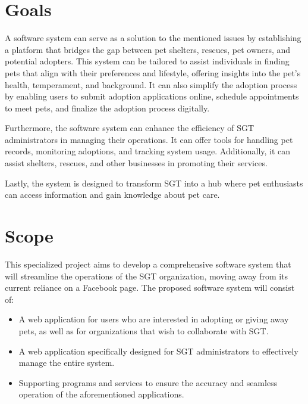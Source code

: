 \section{Goals}

A software system can serve as a solution to the mentioned issues by establishing a platform that bridges the gap between pet shelters, rescues, pet owners, and potential adopters. This system can be tailored to assist individuals in finding pets that align with their preferences and lifestyle, offering insights into the pet’s health, temperament, and background. It can also simplify the adoption process by enabling users to submit adoption applications online, schedule appointments to meet pets, and finalize the adoption process digitally.

Furthermore, the software system can enhance the efficiency of SGT administrators in managing their operations. It can offer tools for handling pet records, monitoring adoptions, and tracking system usage. Additionally, it can assist shelters, rescues, and other businesses in promoting their services.

Lastly, the system is designed to transform SGT into a hub where pet enthusiasts can access information and gain knowledge about pet care.

\section{Scope}

This specialized project aims to develop a comprehensive software system that will streamline the operations of the SGT organization, moving away from its current reliance on a Facebook page. The proposed software system will consist of:
\begin{itemize}
    \item 	A web application for users who are interested in adopting or giving away pets, as well as for organizations that wish to collaborate with SGT.
    \item	A web application specifically designed for SGT administrators to effectively manage the entire system.
    \item 	Supporting programs and services to ensure the accuracy and seamless operation of the aforementioned applications.
\end{itemize}

